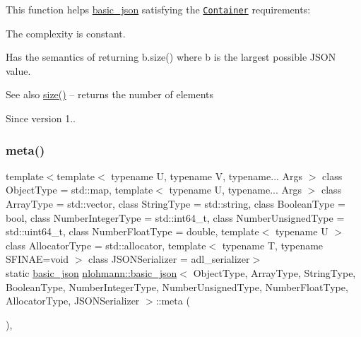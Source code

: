 This function helps {\ttfamily \mbox{\hyperlink{classnlohmann_1_1basic__json}{basic\+\_\+json}}} satisfying the \href{http://en.cppreference.com/w/cpp/concept/Container}{\tt Container} requirements\+:
\begin{DoxyItemize}
\item The complexity is constant.
\item Has the semantics of returning {\ttfamily b.\+size()} where {\ttfamily b} is the largest possible J\+S\+ON value.
\end{DoxyItemize}

\begin{DoxySeeAlso}{See also}
\mbox{\hyperlink{classnlohmann_1_1basic__json_a25e27ad0c6d53c01871c5485e1f75b96}{size()}} -- returns the number of elements
\end{DoxySeeAlso}
\begin{DoxySince}{Since}
version 1.. 
\end{DoxySince}
\mbox{\label{classnlohmann_1_1basic__json_aef6d0eeccee7c5c7e1317c2ea1607fab}} 
\subsubsection{\texorpdfstring{meta()}{meta()}}
{\footnotesize\ttfamily template$<$template$<$ typename U, typename V, typename... Args $>$ class Object\+Type = std\+::map, template$<$ typename U, typename... Args $>$ class Array\+Type = std\+::vector, class String\+Type  = std\+::string, class Boolean\+Type  = bool, class Number\+Integer\+Type  = std\+::int64\+\_\+t, class Number\+Unsigned\+Type  = std\+::uint64\+\_\+t, class Number\+Float\+Type  = double, template$<$ typename U $>$ class Allocator\+Type = std\+::allocator, template$<$ typename T, typename S\+F\+I\+N\+A\+E=void $>$ class J\+S\+O\+N\+Serializer = adl\+\_\+serializer$>$ \\
static \mbox{\hyperlink{classnlohmann_1_1basic__json}{basic\+\_\+json}} \mbox{\hyperlink{classnlohmann_1_1basic__json}{nlohmann\+::basic\+\_\+json}}$<$ Object\+Type, Array\+Type, String\+Type, Boolean\+Type, Number\+Integer\+Type, Number\+Unsigned\+Type, Number\+Float\+Type, Allocator\+Type, J\+S\+O\+N\+Serializer $>$\+::meta (\begin{DoxyParamCaption}{ }\end{DoxyParamCaption})\hspace{0.3cm}{\ttfamily [inline]}, {\ttfamily [static]}}



